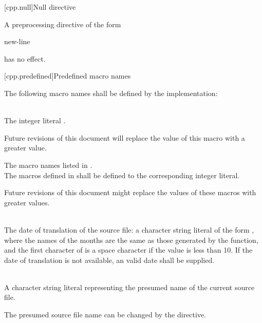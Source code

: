 [cpp.null]{Null directive}%

\pnum
A preprocessing directive of the form
\begin{ncsimplebnf}
\terminal{\#} new-line
\end{ncsimplebnf}
has no effect.

[cpp.predefined]{Predefined macro names}
%

\pnum
The following macro names shall be defined by the implementation:

\begin{description}

\item
{}%
\\
The integer literal \tcode{\cppver}.
\begin{note}
Future revisions of this document will
replace the value of this macro with a greater value.
\end{note}

\item The macro names listed in .\\
The macros defined in  shall be defined to
the corresponding integer literal.
\begin{note}
Future revisions of this document might replace
the values of these macros with greater values.
\end{note}

\item
{}%
\\
The date of translation of the source file:
a character string literal of the form
,
where the names of the months are the same as those generated
by the
function,
and the first character of
is a space character if the value is less than 10.
If the date of translation is not available,
an  valid date
shall be supplied.

\item
{}%
\\
A character string literal representing the presumed name of
the current source file.
\begin{note}
The presumed source file name can be changed by the  directive.
\end{note}


\end{description}
